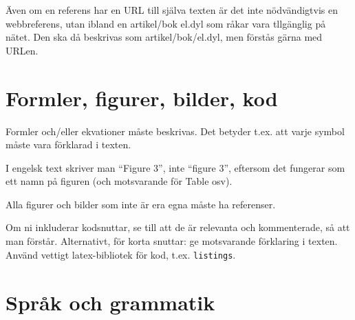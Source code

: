 \documentclass[swedish, a4paper,12pt]{article}
\begin{document}
Även om en referens har en URL till själva texten är det inte nödvändigtvis en webbreferens, utan ibland en artikel/bok el.dyl som råkar vara tllgänglig på nätet. Den ska då beskrivas som artikel/bok/el.dyl, men förstås gärna med URLen.

\section{Formler, figurer, bilder, kod}
\label{sec:forml-figur-bild}

Formler och/eller ekvationer måste beskrivas.  Det betyder t.ex. att varje symbol måste vara förklarad i texten.

I engelsk text skriver man ``Figure 3'', inte ``figure 3'', eftersom det fungerar som ett namn på figuren (och motsvarande för Table osv).

Alla figurer och bilder som inte är era egna måste ha referenser.

Om ni inkluderar kodsnuttar, se till att de är relevanta och kommenterade, så att man förstår.  Alternativt, för korta snuttar: ge motsvarande förklaring i texten.
Använd vettigt latex-bibliotek för kod, t.ex. \texttt{listings}.

\section{Språk och grammatik}
\label{sec:sprak-och-grammatik}
\end{document}
